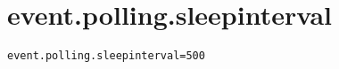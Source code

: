 \section{event.polling.sleepinterval}
\label{configuration:EventPollingSleepinterval}
\ClearAPI
\TODO
{}
\begin{lstlisting}[style=Props,caption={Usage example for \textit{event.polling.sleepinterval}}]
event.polling.sleepinterval=500
\end{lstlisting}